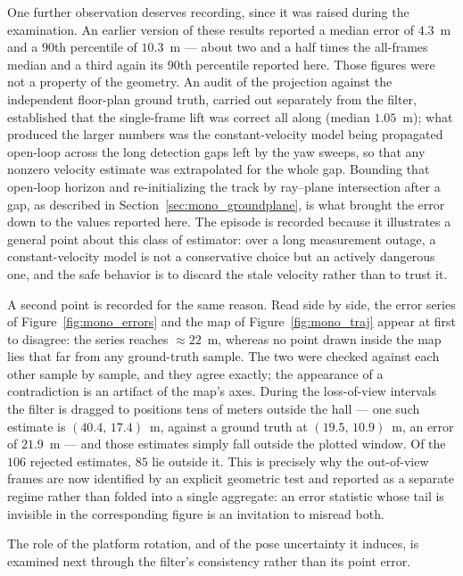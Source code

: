 One further observation deserves recording, since it was raised during the
examination. An earlier version of these results reported a median error of
$4.3$~m and a $90$th percentile of $10.3$~m --- about two and a half times the
all-frames median and a third again its $90$th percentile reported here. Those figures were not a property of the geometry. An audit of the
projection against the independent floor-plan ground truth, carried out
separately from the filter, established that the single-frame lift was correct all
along (median $1.05$~m); what produced the larger numbers was the constant-velocity
model being propagated open-loop across the long detection gaps left by the yaw
sweeps, so that any nonzero velocity estimate was extrapolated for the whole gap.
Bounding that open-loop horizon and re-initializing the track by ray--plane
intersection after a gap, as described in Section~\ref{sec:mono_groundplane}, is
what brought the error down to the values reported here. The episode is recorded
because it illustrates a general point about this class of estimator: over a long
measurement outage, a constant-velocity model is not a conservative choice but an
actively dangerous one, and the safe behavior is to discard the stale velocity
rather than to trust it.

A second point is recorded for the same reason. Read side by side, the error
series of Figure~\ref{fig:mono_errors} and the map of Figure~\ref{fig:mono_traj}
appear at first to disagree: the series reaches ${\approx}22$~m, whereas no point
drawn inside the map lies that far from any ground-truth sample. The two were
checked against each other sample by sample, and they agree exactly; the
appearance of a contradiction is an artifact of the map's axes. During the
loss-of-view intervals the filter is dragged to positions tens of meters outside
the hall --- one such estimate is $(40.4,\,17.4)$~m, against a ground truth at
$(19.5,\,10.9)$~m, an error of $21.9$~m --- and those estimates simply fall
outside the plotted window.
Of the $106$ rejected estimates, $85$ lie outside it. This is precisely why the
out-of-view frames are now identified by an explicit geometric test and reported
as a separate regime rather than folded into a single aggregate: an error
statistic whose tail is invisible in the corresponding figure is an invitation to
misread both.

The role of the platform rotation, and of the pose uncertainty it induces, is
examined next through the filter's consistency rather than its point error.


